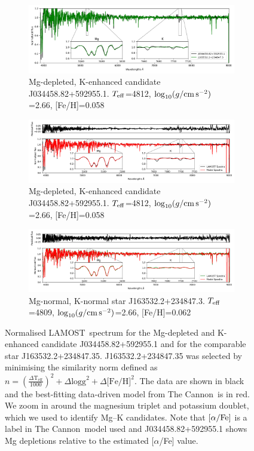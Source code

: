 \documentclass[a4paper,fleqn,usenatbib]{mnras}
\newcommand{\project}[1]{#1}
\newcommand{\lamost}{\project{LAMOST}}
\newcommand{\tc}{\project{The Cannon}}
\newcommand{\teff}{T_{\rm eff}}
\newcommand{\logg}{\log_{10}(g/{\rm cm\,s}^{-2})}
\begin{document}
\begin{figure}
\centering

\begin{subfigure}{1\textwidth}
\centering
\includegraphics[width=\textwidth=1]{similarstarsplot.png}
\caption{Mg-depleted, K-enhanced candidate J034458.82+592955.1. $\teff$=4812, $\logg$=2.66, [Fe/H]=0.058}
\end{subfigure}

\begin{subfigure}{1\textwidth}
\centering
\includegraphics[width=\textwidth=1]{posterchild.png}
\caption{Mg-depleted, K-enhanced candidate J034458.82+592955.1. $\teff$=4812, $\logg$=2.66, [Fe/H]=0.058}
\end{subfigure}

\begin{subfigure}{1\textwidth}
\centering
\includegraphics[width=\textwidth=1]{postermimic.png}
\caption{Mg-normal, K-normal star J163532.2+234847.3. $\teff$=4809, $\logg$=2.66, [Fe/H]=0.062}
\end{subfigure}

\caption{Normalised \lamost\ spectrum for the Mg-depleted and K-enhanced candidate J034458.82+592955.1 and for the comparable star J163532.2+234847.35. J163532.2+234847.35 was selected by minimising the similarity norm defined as $n=(\frac{\Delta \text{T}_{\text{eff}}}{1000})^2 +\Delta \text{logg} ^2 + \Delta \text{[Fe/H]}^2$. The data are shown in black and the best-fitting data-driven model from \tc\ is in red. We zoom in around the magnesium triplet and potassium doublet, which we used to identify Mg--K candidates. Note that $[\alpha/{\rm Fe}]$ is a label in \tc\ model used and J034458.82+592955.1 shows Mg depletions relative to the estimated [$\alpha$/Fe] value.}
\label{posterchild}
\end{figure}
\end{document}

